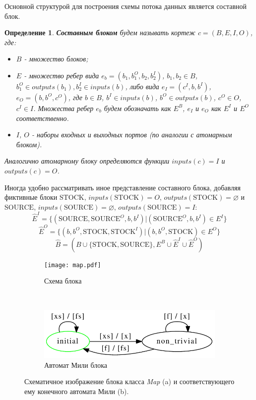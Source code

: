 \documentclass[10pt,a4paper]{article}
\newtheorem{defen}{Определение}
\newcommand{\stock}{\text{STOCK}}
\newcommand{\source}{\text{SOURCE}}
\begin{document}
Основной структурой для построения схемы потока данных является составной блок.

\begin{defen}
 \textbf{Составным блоком} будем называть кортеж $c = (B, E, I, O)$, где:
 \begin{itemize}
    \item $B$ - множество блоков;
    \item $E$ - множество ребер вида $e_b = (b_1, b^O_{1}, b_2, b^I_{2})$, $b_1, b_2 \in B$, $b^O_{1} \in outputs(b_1), b^I_{2} \in inputs(b)$,
                либо вида $e_I = (c^I, b, b^I)$, $e_O = (b, b^O, c^O)$, где $b \in B$, $b^I \in inputs(b)$, $b^O \in outputs(b)$, $c^O \in O$, $c^I \in I$.
                Множества ребер $e_b$ будем обозначать как $E^B$, $e_I$ и $e_O$ как $E^I$ и $E^O$ соответственно.
    \item $I$, $O$ - наборы входных и выходных портов (по аналогии с атомарным блоком).
  \end{itemize}
  Аналогично атомарному блоку определяются функции $inputs(c) = I$ и $outputs(c) = O$.
\end{defen}

Иногда удобно рассматривать иное представление составного блока, добавляя фиктивные блоки $\stock$, $inputs(\stock) = O$, $outputs(\stock) = \varnothing$
  и $\source$, $inputs(\source) = \varnothing$, $outputs(\source) = I$:
$$\hat{E}^I = \{(\source, \source^O, b, b^I) \vert (\source^O, b, b^I) \in E^I\}$$
$$\hat{E}^O = \{ (b, b^O, \stock, \stock^I) \vert (b, b^O, \stock) \in E^O \}$$
$$\hat{B} = (B \cup \{\stock, \source\}, E^B \cup \hat{E}^I \cup \hat{E}^O)$$

\begin{figure}[H]
  \centering

  \begin{subfigure}[b]{0.2\textwidth}
    \centering
    \label{map:connection}
    \texttt{[image: map.pdf]}
    \caption{Схема блока}
  \end{subfigure}
  ~
  \begin{subfigure}[b]{0.7\textwidth}
    \centering
    \label{map:fa}
    \includegraphics[width=\textwidth]{map_fa.pdf}
    \caption{Автомат Мили блока}
  \end{subfigure}
  
  \label{map}
  \caption{Схематичное изображение блока класса \textit{Map} (a) и соответствующего ему конечного автомата Мили (b).}
\end{figure}
\end{document}
